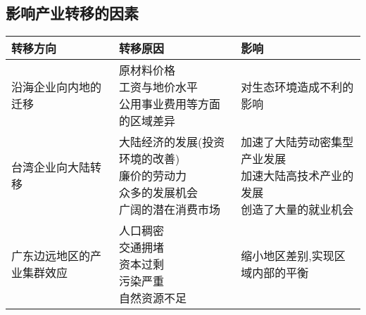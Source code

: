 \documentclass[a4paper]{article}
\begin{document}
    \subsection{影响产业转移的因素}
        \begin{tabular}{|p{20mm}|l|p{60mm}|}
            \hline
            转移方向 &   转移原因    &   影响    \\
            \hline
            沿海企业向内地的迁移  &  \makecell[l]{原材料价格 \\ 工资与地价水平 \\ 公用事业费用等方面的区域差异}  &  对生态环境造成不利的影响    \\
            \hline
            台湾企业向大陆转移  &  \makecell[l]{大陆经济的发展(投资环境的改善) \\ 廉价的劳动力 \\ 众多的发展机会 \\ 广阔的潜在消费市场}  &   \makecell[l]{加速了大陆劳动密集型产业发展\\加速大陆高技术产业的发展 \\ 创造了大量的就业机会} \\
            \hline
            广东边远地区的产业集群效应  &  \makecell[l]{人口稠密 \\ 交通拥堵 \\ 资本过剩 \\ 污染严重 \\ 自然资源不足}   &   缩小地区差别,实现区域内部的平衡 \\
            \hline
        \end{tabular}
\end{document}
